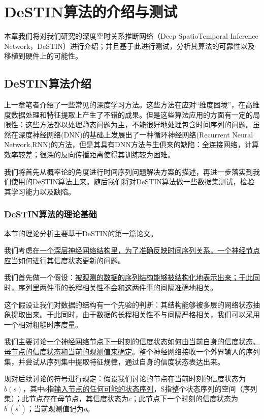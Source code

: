 \chapter{DeSTIN算法的介绍与测试}\label{chapter_algorithm}
\graphicspath{{chapter3/figure/}}

本章我们将对我们研究的深度空时关系推断网络（Deep SpatioTemporal Inference Network，DeSTIN）进行介绍；并且基于此进行测试，分析其算法的可靠性以及移植到硬件上的可能性。

\section{DeSTIN算法介绍}

上一章笔者介绍了一些常见的深度学习方法。这些方法在应对“维度困境”，在高维度数据处理和特征提取上产生了不错的成果。但是这些算法应用的方面有一定的局限性：这些方法都以处理静态问题为主，不能很好地处理包含时间序列的问题。虽然在深度神经网络(DNN)的基础上发展出了一种循环神经网络(Recurrent Neural Network,RNN)的方法，但是其具有DNN方法与生俱来的缺陷：全连接网络，计算效率较差；很深的反向传播距离使得其训练较为困难。

我们将首先从概率论的角度进行时间序列问题解决方案的描述，再进一步落实到我们使用的DeSTIN算法上来。随后我们将对DeSTIN算法做一些数据集测试，检验其学习能力以及缺陷。

\subsection{DeSTIN算法的理论基础}

本节的理论分析主要基于DeSTIN的第一篇论文。\cite{Arel2009DeSTIN}

我们考虑\uline{在一个深层神经网络结构里，为了准确反映时间序列关系，一个神经节点应当如何进行其信度状态更新}的问题。

我们首先做一个假设：\uline{被观测的数据的序列结构能够被结构化地表示出来；于此同时，序列里两件事的长程相关性不会和这两件事的间隔准确地相关}。

这个假设让我们对数据的结构有一个先验的判断：其结构能够被多层的网络状态抽象提取出来。于此同时，由于数据的长程相关性不与间隔严格相关，我们可以采用一个相对粗糙时序度量。

我们主要讨论\uline{一个神经网络节点下一时刻的信度状态如何由当前自身的信度状态、母节点的信度状态和当前的观测值来确定}。整个神经网络接收一个外界输入的序列集，并尝试从序列集中提取特征规律，通过自身的信度状态表达出来。

现对后续讨论的符号进行规定：假设我们讨论的节点在当前时刻的信度状态为$b(s)$，其中s指\uline{输入节点的任何可能的状态序列}，S指整个状态序列的空间（序列集）；此节点存在母节点，其信度状态为$c$；此节点下一个时刻的信度状态为$b^\prime(s^\prime)$；当前观测值记为$o$。

